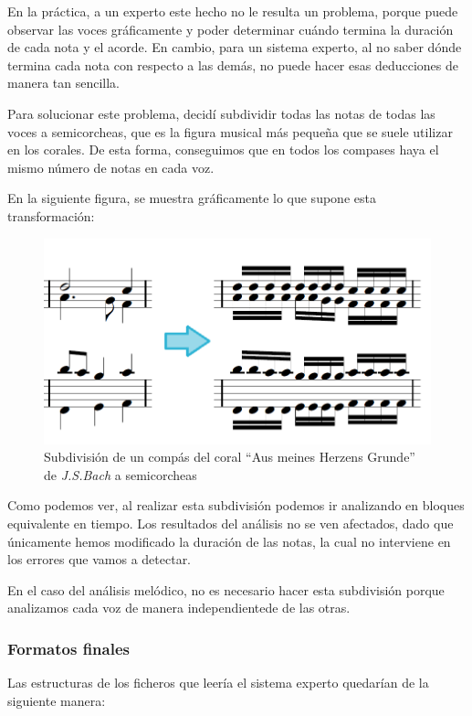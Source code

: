 En la práctica, a un experto este hecho no le resulta un problema, porque puede observar las voces gráficamente y poder determinar cuándo termina la duración de cada nota y el acorde. En cambio, para un sistema experto, al no saber dónde termina cada nota con respecto a las demás, no puede hacer esas deducciones de manera tan sencilla. 

Para solucionar este problema, decidí subdividir todas las notas de todas las voces a semicorcheas, que es la figura musical más pequeña que se suele utilizar en los corales. De esta forma, conseguimos que en todos los compases haya el mismo número de notas en cada voz.

En la siguiente figura, se muestra gráficamente lo que supone esta transformación:


\begin{figure}[H]
	\centering
	\includegraphics[scale=0.5]{imagenes/division.png}
	\caption{Subdivisión de un compás del coral ``Aus meines Herzens Grunde'' de \textit{J.S.Bach} a semicorcheas}
	\label{fig5.1.1}
\end{figure}

Como podemos ver, al realizar esta subdivisión podemos ir analizando en bloques equivalente en tiempo. Los resultados del análisis no se ven afectados, dado que únicamente hemos modificado la duración de las notas, la cual no interviene en los errores que vamos a detectar.

En el caso del análisis melódico, no es necesario hacer esta subdivisión porque analizamos cada voz de manera independientede de las otras.

\subsubsection{Formatos finales}

Las estructuras de los ficheros que leería el sistema experto quedarían de la siguiente manera:

